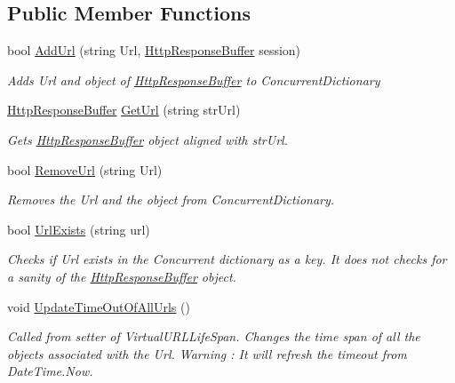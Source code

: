 \subsection*{Public Member Functions}
\begin{DoxyCompactItemize}
\item 
bool \mbox{\hyperlink{class_concord_1_1_c3_http_module_1_1_http_url_list_acde20901c40b7add9cb2db32ab1c9953}{Add\+Url}} (string Url, \mbox{\hyperlink{class_concord_1_1_c3_http_module_1_1_http_response_buffer}{Http\+Response\+Buffer}} session)
\begin{DoxyCompactList}\small\item\em Adds Url and object of \mbox{\hyperlink{class_concord_1_1_c3_http_module_1_1_http_response_buffer}{Http\+Response\+Buffer}} to Concurrent\+Dictionary \end{DoxyCompactList}\item 
\mbox{\hyperlink{class_concord_1_1_c3_http_module_1_1_http_response_buffer}{Http\+Response\+Buffer}} \mbox{\hyperlink{class_concord_1_1_c3_http_module_1_1_http_url_list_a561da818d67bb58784165f31e53fe2d4}{Get\+Url}} (string str\+Url)
\begin{DoxyCompactList}\small\item\em Gets \mbox{\hyperlink{class_concord_1_1_c3_http_module_1_1_http_response_buffer}{Http\+Response\+Buffer}} object aligned with str\+Url. \end{DoxyCompactList}\item 
bool \mbox{\hyperlink{class_concord_1_1_c3_http_module_1_1_http_url_list_acddaf4910903d915828c82b7c61f3fdc}{Remove\+Url}} (string Url)
\begin{DoxyCompactList}\small\item\em Removes the Url and the object from Concurrent\+Dictionary. \end{DoxyCompactList}\item 
bool \mbox{\hyperlink{class_concord_1_1_c3_http_module_1_1_http_url_list_a827cc894faba7a6e238d2c88d5f713a4}{Url\+Exists}} (string url)
\begin{DoxyCompactList}\small\item\em Checks if Url exists in the Concurrent dictionary as a key. It does not checks for a sanity of the \mbox{\hyperlink{class_concord_1_1_c3_http_module_1_1_http_response_buffer}{Http\+Response\+Buffer}} object. \end{DoxyCompactList}\item 
void \mbox{\hyperlink{class_concord_1_1_c3_http_module_1_1_http_url_list_ac7cb0246fc6be60e897fc560bbf1fd13}{Update\+Time\+Out\+Of\+All\+Urls}} ()
\begin{DoxyCompactList}\small\item\em Called from setter of Virtual\+U\+R\+L\+Life\+Span. Changes the time span of all the objects associated with the Url. Warning \+: It will refresh the timeout from Date\+Time.\+Now. \end{DoxyCompactList}\end{DoxyCompactItemize}
